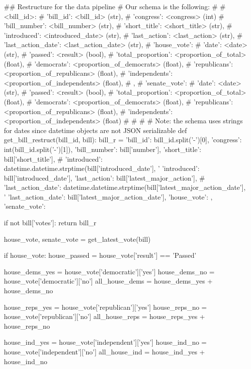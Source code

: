 \begin{pyin}
\## Restructure for the data pipeline
# Our schema is the following:
# {
#   <bill_id>: {
#     'bill_id': <bill_id> (str),
#     'congress': <congress> (int)
#     'bill_number': <bill_number> (str),
#     'short_title': <short_title> (str),
#     'introduced': <introduced_date> (str),
#     'last_action': <last_action> (str),
#     'last_action_date': <last_action_date> (str),
#     'house_vote': {
#       'date': <date> (str),
#       'passed': <result> (bool),
#       'total_proportion': <proportion_of_total> (float),
#       'democrats': <proportion_of_democrats> (float),
#       'republicans': <proportion_of_republicans> (float),
#       'independents': <proportion_of_independents> (float),
#     },
#     'senate_vote': {
#       'date': <date> (str),
#       'passed': <result> (bool),
#       'total_proportion': <proportion_of_total> (float),
#       'democrats': <proportion_of_democrats> (float),
#       'republicans': <proportion_of_republicans> (float),
#       'independents': <proportion_of_independents> (float)
#     }
#   }
# }
# Note: the schema uses strings for dates since datetime objects are not JSON serializable
def get_bill_restruct(bill_id, bill):
    bill_r = {
        'bill_id': bill_id.split('-')[0],
        'congress': int(bill_id.split('-')[1]),
        'bill_number': bill['number'],
        'short_title': bill['short_title'],
        # 'introduced': datetime.datetime.strptime(bill['introduced_date'], '%
        'introduced': bill['introduced_date'],
        'last_action': bill['latest_major_action'],
        # 'last_action_date': datetime.datetime.strptime(bill['latest_major_action_date'], '%
        'last_action_date': bill['latest_major_action_date'],
        'house_vote': {},
        'senate_vote': {}
    }

    if not bill['votes']:
        return bill_r

    house_vote, senate_vote = get_latest_vote(bill)

    if house_vote:
        house_passed = house_vote['result'] == 'Passed'

        house_dems_yes = house_vote['democratic']['yes']
        house_dems_no = house_vote['democratic']['no']
        all_house_dems = house_dems_yes + house_dems_no

        house_reps_yes = house_vote['republican']['yes']
        house_reps_no = house_vote['republican']['no']
        all_house_reps = house_reps_yes + house_reps_no

        house_ind_yes = house_vote['independent']['yes']
        house_ind_no = house_vote['independent']['no']
        all_house_ind = house_ind_yes + house_ind_no


\end{pyin}
